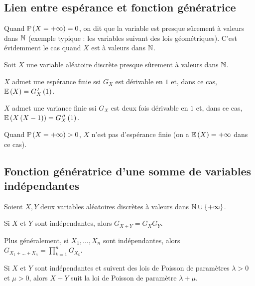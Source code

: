 \subsection{Lien entre espérance et fonction génératrice}

Quand \(\mathbb{P}\left(X=+\infty\right)=0\), on dit que la variable est presque sûrement à valeurs dans \(\mathbb{N}\) (exemple typique : les variables suivant des lois géométriques). C'est évidemment le cas quand \(X\) est à valeurs dans \(\mathbb{N}\).

\begin{theo}
Soit \(X\) une variable aléatoire discrète presque sûrement à valeurs dans \(\mathbb{N}\).

\(X\) admet une espérance finie ssi \(G_X\) est dérivable en \(1\) et, dans ce cas, \(\operatorname{\mathbb{E}}\left(X\right)=G_X^{\,\prime}\left(1\right)\).

\(X\) admet une variance finie ssi \(G_X\) est deux fois dérivable en \(1\) et, dans ce cas, \(\operatorname{\mathbb{E}}\left(X\left(X-1\right)\right)=G_X^{\,\prime\prime}\left(1\right)\).
\end{theo}

Quand \(\mathbb{P}\left(X=+\infty\right)>0\), \(X\) n'est pas d'espérance finie (on a \(\operatorname{\mathbb{E}}\left(X\right)=+\infty\) dans ce cas).

\subsection{Fonction génératrice d'une somme de variables indépendantes}

\begin{prop}
Soient \(X,Y\) deux variables aléatoires discrètes à valeurs dans \(\mathbb{N}\cup\left\lbrace+\infty\right\rbrace\).

Si \(X\) et \(Y\) sont indépendantes, alors \(G_{X+Y}=G_XG_Y\).
\end{prop}

Plus généralement, si \(X_1,\dots,X_n\) sont indépendantes, alors \(G_{X_1+\dots+X_n}=\prod_{k=1}^nG_{X_k}\).

\begin{ex}
Si \(X\) et \(Y\) sont indépendantes et suivent des lois de Poisson de paramètres \(\lambda>0\) et \(\mu>0\), alors \(X+Y\) suit la loi de Poisson de paramètre \(\lambda+\mu\).
\end{ex}
